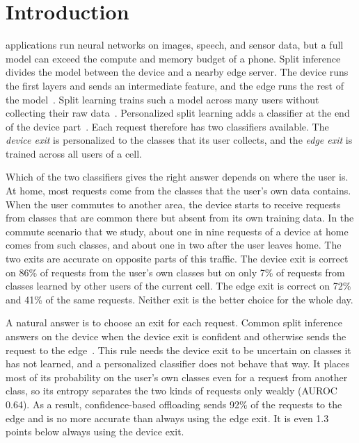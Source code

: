 \section{Introduction}
\label{sec:intro}

 applications run neural networks on images, speech, and sensor data, but a full model can exceed the compute and memory budget of a phone. Split inference divides the model between the device and a nearby edge server. The device runs the first layers and sends an intermediate feature, and the edge runs the rest of the model~\cite{kang2017neurosurgeon,laskaridis2020spinn}. Split learning trains such a model across many users without collecting their raw data~\cite{gupta2018distributed,vepakomma2018split,thapa2022splitfed}. Personalized split learning adds a classifier at the end of the device part~\cite{han2023splitgp,rizwan2026splitomc}. Each request therefore has two classifiers available. The \emph{device exit} is personalized to the classes that its user collects, and the \emph{edge exit} is trained across all users of a cell.

Which of the two classifiers gives the right answer depends on where the user is. At home, most requests come from the classes that the user's own data contains. When the user commutes to another area, the device starts to receive requests from classes that are common there but absent from its own training data. In the commute scenario that we study, about one in nine requests of a device at home comes from such classes, and about one in two after the user leaves home. The two exits are accurate on opposite parts of this traffic. The device exit is correct on 86\% of requests from the user's own classes but on only 7\% of requests from classes learned by other users of the current cell. The edge exit is correct on 72\% and 41\% of the same requests. Neither exit is the better choice for the whole day.

A natural answer is to choose an exit for each request. Common split inference answers on the device when the device exit is confident and otherwise sends the request to the edge~\cite{han2023splitgp,laskaridis2020spinn,teerapittayanon2016branchynet}. This rule needs the device exit to be uncertain on classes it has not learned, and a personalized classifier does not behave that way. It places most of its probability on the user's own classes even for a request from another class, so its entropy separates the two kinds of requests only weakly (AUROC 0.64). As a result, confidence-based offloading sends 92\% of the requests to the edge and is no more accurate than always using the edge exit. It is even 1.3 points below always using the device exit.

